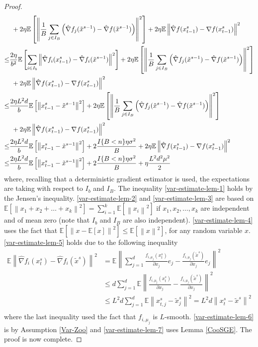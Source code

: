 \documentclass{article}
\newcommand*{\E}{\mathbb{E}}
\newcommand{\norm}[1]{\left\lVert#1\right\rVert}
\theoremstyle{definition}
\theoremstyle{remark}
\begin{document}
\begin{proof}
\begin{align}
   &\,\, \label{var-estimate-lem-3}+ 2\eta \E \left[ \norm{\frac{1}{B}\sum_{j\in I_B}\left(\hat{\nabla} f_j(\tilde{x}^{s-1}) - \hat{\nabla} f(\tilde{x}^{s-1})\right)}^2\right]+2\eta \E \norm{\hat{\nabla} f(x_{t-1}^s)-\nabla f(x_{t-1}^s)}^2\\
   \leq  &\frac{2\eta}{b^2}\E\left[\sum_{i\in I_b}\norm{\hat{\nabla} f_i(x_{t-1}^s)-\hat{\nabla} f_i(\tilde{x}^{s-1})}^2\right]+ 2\eta \E \left[ \norm{\frac{1}{B}\sum_{j\in I_B}\left(\hat{\nabla} f_j(\tilde{x}^{s-1}) - \hat{\nabla} f(\tilde{x}^{s-1})\right)}^2\right]\notag\\
   &\,\,\label{var-estimate-lem-4}+2\eta \E \norm{\hat{\nabla} f(x_{t-1}^s)-\nabla f(x_{t-1}^s)}^2\\
    \leq  &\frac{2\eta L^2 d}{b}\E\left[\norm{x_{t-1}^s-\tilde{x}^{s-1}}^2\right]+ 2\eta \E \left[ \norm{\frac{1}{B}\sum_{j\in I_B}\left(\hat{\nabla} f_j(\tilde{x}^{s-1}) - \hat{\nabla} f(\tilde{x}^{s-1})\right)}^2\right]\notag\\
   &\,\,\label{var-estimate-lem-5}+2\eta \E \norm{\hat{\nabla} f(x_{t-1}^s)-\nabla f(x_{t-1}^s)}^2\\
   \leq  &\label{var-estimate-lem-6}\frac{2\eta L^2 d}{b}\E\left[\norm{x_{t-1}^s-\tilde{x}^{s-1}}^2\right]+ 2\frac{I\{B < n\}\eta \sigma ^2}{B}+2\eta \E \norm{\hat{\nabla} f(x_{t-1}^s)-\nabla f(x_{t-1}^s)}^2\\
   \leq  &\label{var-estimate-lem-7}\frac{2\eta L^2 d}{b}\E\left[\norm{x_{t-1}^s-\tilde{x}^{s-1}}^2\right]+ 2\frac{I\{B < n\}\eta \sigma ^2}{B}+\eta \frac{L^2 d^2 \mu^2}{2}
 \end{align}
 where, recalling that a deterministic gradient estimator is used, the expectations are taking with respect to $I_b$ and $I_B$. The inequality \eqref{var-estimate-lem-1} holds by the Jensen’s inequality. \eqref{var-estimate-lem-2} and \eqref{var-estimate-lem-3} are based on $\E[\norm{x_1+x_2+\ldots+x_k}^2] = \sum_{i=1}^k \E[\norm{x_i}^2]$ if $x_1,x_2,\ldots,x_k$ are independent and of mean zero (note that $I_b$ and $I_B$ are also independent). \eqref{var-estimate-lem-4} uses the fact that $\E[\norm{x-\E[x]}^2] \leq \E[\norm{x}^2]$, for any random variable $x$. \eqref{var-estimate-lem-5} holds due to the following inequality  
 \begin{equation}
 \begin{split}
 \E \norm{\hat{\nabla} f_i(x_{t}^s)-\hat{\nabla} f_i(\tilde{x}^s)}^2 &= \E \norm{ \sum_{j=1}^d\frac{f_{i,\mu_j}(x_{t}^s)}{\partial x_j}e_j-\frac{f_{i,\mu_j}(\tilde{x}^s)}{\partial x_j}e_j}^2\\
 &\leq d \sum_{j=1}^d \E \norm{ \frac{f_{i,\mu_j}(x_{t}^s)}{\partial x_j}-\frac{f_{i,\mu_j}(\tilde{x}^s)}{\partial x_j}}^2\\
 &\leq L^2 d \sum_{j=1}^d \E \norm{x_{t,j}^s-\tilde{x}_{j}^s}^2 = L^2 d \norm{x_{t}^s-\tilde{x}^s}^2\\
 \end{split}
 \end{equation}
  where the last inequality used the fact that $f_{i,\mu_j}$ is $L$-smooth. \eqref{var-estimate-lem-6} is by Assumption \ref{Var-Zoo} and \eqref{var-estimate-lem-7} uses Lemma \ref{CooSGE}. The proof is now complete.
\end{proof}
\end{document}
